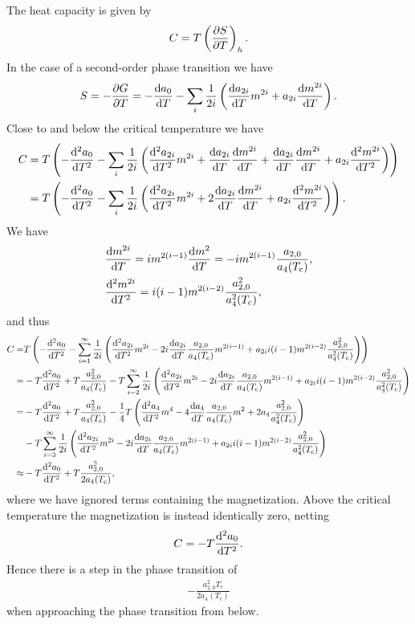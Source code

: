 The heat capacity is given by
\begin{align*}
	C = T\left(\pdv{S}{T}\right)_{h}.
\end{align*}
In the case of a second-order phase transition we have
\begin{align*}
	S = -\pdv{G}{T} = -\dv{a_{0}}{T} - \sum\limits_{i}\frac{1}{2i}\left(\dv{a_{2i}}{T}m^{2i} + a_{2i}\dv{m^{2i}}{T}\right).
\end{align*}
Close to and below the critical temperature we have
\begin{align*}
	C &= T\left(-\dv[2]{a_{0}}{T} - \sum\limits_{i}\frac{1}{2i}\left(\dv[2]{a_{2i}}{T}m^{2i} + \dv{a_{2i}}{T}\dv{m^{2i}}{T} + \dv{a_{2i}}{T}\dv{m^{2i}}{T} + a_{2i}\dv[2]{m^{2i}}{T}\right)\right) \\
	  &= T\left(-\dv[2]{a_{0}}{T} - \sum\limits_{i}\frac{1}{2i}\left(\dv[2]{a_{2i}}{T}m^{2i} + 2\dv{a_{2i}}{T}\dv{m^{2i}}{T} + a_{2i}\dv[2]{m^{2i}}{T}\right)\right).
\end{align*}
We have
\begin{align*}
	&\dv{m^{2i}}{T} = im^{2(i - 1)}\dv{m^{2}}{T} = -im^{2(i - 1)}\frac{a_{2, 0}}{a_{4}(T_{\text{c}})}, \\
	&\dv[2]{m^{2i}}{T} = i(i - 1)m^{2(i - 2)}\frac{a_{2, 0}^{2}}{a_{4}^{2}(T_{\text{c}})},
\end{align*}
and thus
\begin{align*}
	C =& T\left(-\dv[2]{a_{0}}{T} - \sum\limits_{i = 1}^{\infty}\frac{1}{2i}\left(\dv[2]{a_{2i}}{T}m^{2i} - 2i\dv{a_{2i}}{T}\frac{a_{2, 0}}{a_{4}(T_{\text{c}})}m^{2(i - 1)} + a_{2i}i(i - 1)m^{2(i - 2)}\frac{a_{2, 0}^{2}}{a_{4}^{2}(T_{\text{c}})}\right)\right) \\
	  =& -T\dv[2]{a_{0}}{T} + T\frac{a_{2, 0}^{2}}{a_{4}(T_{\text{c}})} - T\sum\limits_{i = 2}^{\infty}\frac{1}{2i}\left(\dv[2]{a_{2i}}{T}m^{2i} - 2i\dv{a_{2i}}{T}\frac{a_{2, 0}}{a_{4}(T_{\text{c}})}m^{2(i - 1)} + a_{2i}i(i - 1)m^{2(i - 2)}\frac{a_{2, 0}^{2}}{a_{4}^{2}(T_{\text{c}})}\right) \\
	  =& -T\dv[2]{a_{0}}{T} + T\frac{a_{2, 0}^{2}}{a_{4}(T_{\text{c}})} - \frac{1}{4}T\left(\dv[2]{a_{4}}{T}m^{4} - 4\dv{a_{4}}{T}\frac{a_{2, 0}}{a_{4}(T_{\text{c}})}m^{2} + 2a_{4}\frac{a_{2, 0}^{2}}{a_{4}^{2}(T_{\text{c}})}\right) \\
	   &- T\sum\limits_{i = 3}^{\infty}\frac{1}{2i}\left(\dv[2]{a_{2i}}{T}m^{2i} - 2i\dv{a_{2i}}{T}\frac{a_{2, 0}}{a_{4}(T_{\text{c}})}m^{2(i - 1)} + a_{2i}i(i - 1)m^{2(i - 2)}\frac{a_{2, 0}^{2}}{a_{4}^{2}(T_{\text{c}})}\right) \\
	   \approx& -T\dv[2]{a_{0}}{T} + T\frac{a_{2, 0}^{2}}{2a_{4}(T_{\text{c}})},
\end{align*}
where we have ignored terms containing the magnetization. Above the critical temperature the magnetization is instead identically zero, netting
\begin{align*}
	C = -T\dv[2]{a_{0}}{T}.
\end{align*}
Hence there is a step in the phase transition of
\begin{align*}
	-\frac{a_{2, 0}^{2}T_{\text{c}}}{2a_{4}(T_{\text{c}})}
\end{align*}
when approaching the phase transition from below.

